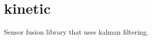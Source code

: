 \chapter{kinetic }
\hypertarget{md_README}{}\label{md_README}
\label{md_README_autotoc_md8}%
%


Sensor fusion library that uses kalman filtering. 
